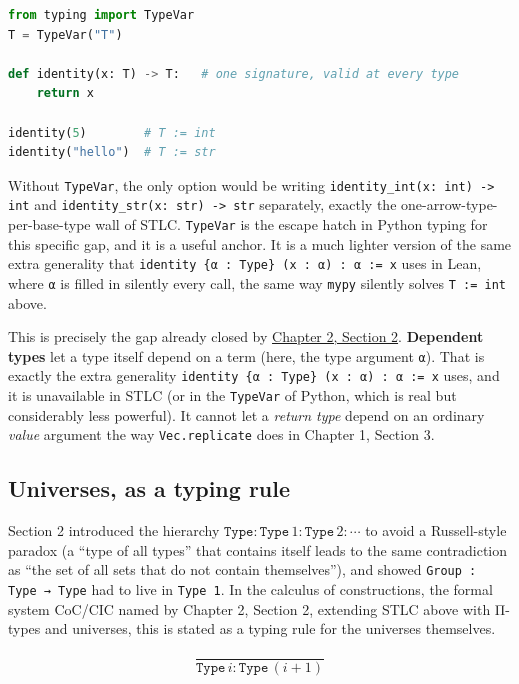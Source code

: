 \begin{lstlisting}[language=Python,style=python]
from typing import TypeVar
T = TypeVar("T")

def identity(x: T) -> T:   # one signature, valid at every type
    return x

identity(5)        # T := int
identity("hello")  # T := str
\end{lstlisting}

Without \texttt{TypeVar}, the only option would be writing \texttt{identity\_\allowbreak{}int(x: int) -\allowbreak{}> int} and \texttt{identity\_\allowbreak{}str(x: str) -\allowbreak{}> str} separately, exactly the one-arrow-type-per-base-type wall of STLC. \texttt{TypeVar} is the escape hatch in Python typing for this specific gap, and it is a useful anchor. It is a much lighter version of the same extra generality that \texttt{identity \{α : Type\} (x : α) : α := x} uses in Lean, where \texttt{α} is filled in silently every call, the same way \texttt{mypy} silently solves \texttt{T := int} above.

This is precisely the gap already closed by \hyperref[sec:02-terminology-and-coc:02-pi-sigma-and-coc:1]{Chapter 2, Section 2}. \textbf{Dependent types} let a type itself depend on a term (here, the type argument \texttt{α}). That is exactly the extra generality \texttt{identity \{α : Type\} (x : α) : α := x} uses, and it is unavailable in STLC (or in the \texttt{TypeVar} of Python, which is real but considerably less powerful). It cannot let a \emph{return type} depend on an ordinary \emph{value} argument the way \texttt{Vec.replicate} does in Chapter 1, Section 3.

\subsection{Universes, as a typing rule}\label{sec:06-rigor-check:03-typing-rules-and-safety:6}

Section 2 introduced the hierarchy \(\mathtt{Type} : \mathtt{Type}\,1 :
\mathtt{Type}\,2 : \cdots\) to avoid a Russell-style paradox (a ``type of all types'' that contains itself leads to the same contradiction as ``the set of all sets that do not contain themselves''), and showed \texttt{Group : Type → Type} had to live in \texttt{Type 1}. In the calculus of constructions, the formal system CoC/CIC named by Chapter 2, Section 2, extending STLC above with Π-types and universes, this is stated as a typing rule for the universes themselves.

\[
\dfrac{}{\mathtt{Type}\,i : \mathtt{Type}\,(i+1)}
\]

